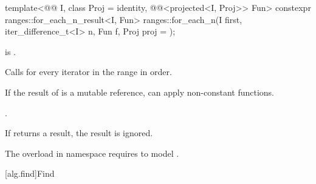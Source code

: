 %
\begin{itemdecl}
template<@@ I, class Proj = identity,
         @@<projected<I, Proj>> Fun>
  constexpr ranges::for_each_n_result<I, Fun>
    ranges::for_each_n(I first, iter_difference_t<I> n, Fun f, Proj proj = {});
\end{itemdecl}

\begin{itemdescr}
\pnum
\expects
{} is .

\pnum
\effects
Calls 
for every iterator  in the range
 in order.
\begin{note}
If the result of  is a mutable reference,
 can apply non-constant functions.
\end{note}

\pnum
\returns
{}.

\pnum
\remarks
If  returns a result, the result is ignored.

\pnum
\begin{note}
The overload in namespace 
requires  to model .
\end{note}
\end{itemdescr}

[alg.find]{Find}


